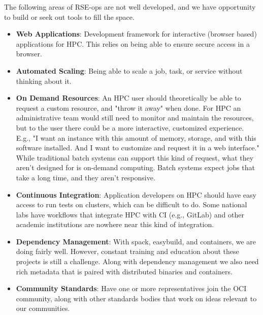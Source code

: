The following areas of RSE-ops are not well developed, and we have opportunity to build or seek out tools to fill the space.

\begin{itemize}
\item \textbf{Web Applications}: Development framework for interactive (browser based) applications for HPC. This relies on being able to ensure secure access in a browser.
\item \textbf{Automated Scaling}:  Being able to scale a job, task, or service without thinking about it.
\item \textbf{On Demand Resources}: An HPC user should theoretically be able to request a custom resource, and "throw it away" when done. For HPC an administrative team would still need to monitor and maintain the resources, but to the user there could be a more interactive, customized experience. E.g., "I want an instance with this amount of memory, storage, and with this software installed. And I want to customize and request it in a web interface." While traditional batch systems can support this kind of request, what they aren't designed for is on-demand computing. Batch systems expect jobs that take a long time, and they aren't responsive.


\item \textbf{Continuous Integration}: Application developers on HPC should have easy access to run tests on clusters, which can be difficult to do. Some national labs have workflows that integrate HPC with CI (e.g., GitLab) and other academic institutions are nowhere near this kind of integration.

\item \textbf{Dependency Management}: With spack, easybuild, and containers, we are doing fairly well. However, constant training and education about these projects is still a challenge. Along with dependency management we also need rich metadata that is paired with distributed binaries and containers.

\item \textbf{Community Standards}: Have one or more representatives join the OCI community, along with other standards bodies that work on ideas relevant to our communities.


\end{itemize}
